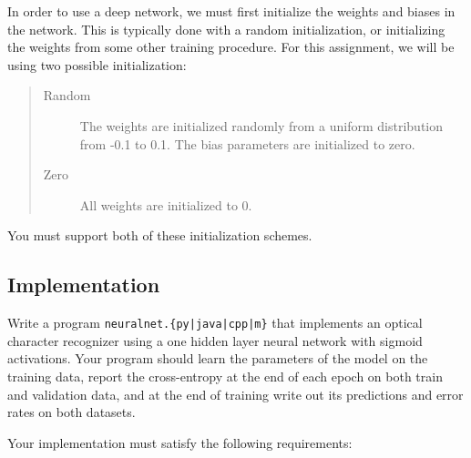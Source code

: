 \documentclass[11pt]{article}
\numberwithin{equation}{section} %
\numberwithin{figure}{section} %
\numberwithin{table}{section} %
\begin{document}
In order to use a deep network, we must first initialize the weights and biases in the network. This is typically done with a random initialization, or initializing the weights from some other training procedure. For this assignment, we will be using two possible initialization: 
\begin{quote}
\begin{description}
\item[{\sc Random}] The weights are initialized randomly from a uniform distribution from -0.1 to 0.1. The bias parameters are initialized to zero.
\item[{\sc Zero}] All weights are initialized to 0.  
\end{description}
\end{quote}

You must support both of these initialization schemes.

\subsection{Implementation}
\label{sec:model}
Write a program \texttt{neuralnet.\{py|java|cpp|m\}} that implements an optical character recognizer using a one hidden layer neural network with sigmoid activations. Your program should learn the parameters of the model on the training data, report the cross-entropy at the end of each epoch on both train and validation data, and at the end of training write out its predictions and error rates on both datasets. 
%

Your implementation must satisfy the following requirements:
\end{document}
